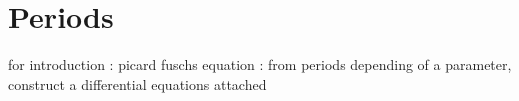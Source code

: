 \section{Periods}

for introduction : picard fuschs equation : from periods depending of a parameter, construct a differential equations attached